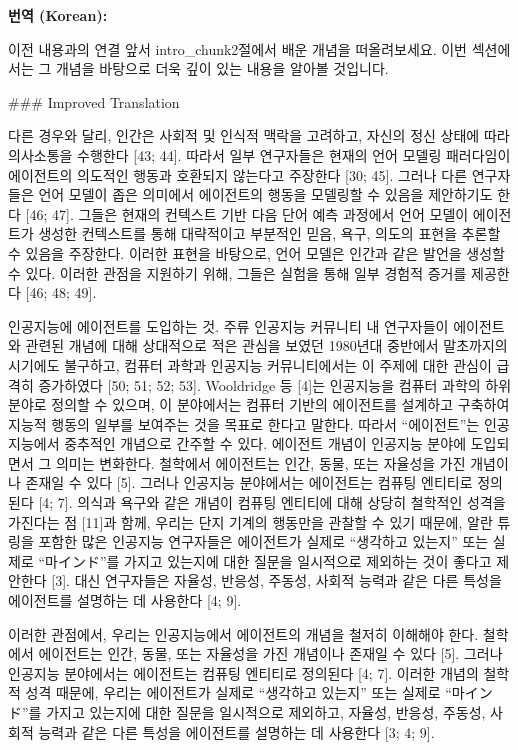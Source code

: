 \documentclass[12pt,a4paper]{article}
\begin{document}
\begin{mdframed}[style=ko]
\noindent\textbf{\small 번역 (Korean):}\\[2pt]
\begin{linkbox}{이전 내용과의 연결}
  앞서 intro_chunk2절에서 배운 개념을 떠올려보세요. 이번 섹션에서는 그 개념을 바탕으로 더욱 깊이 있는 내용을 알아볼 것입니다.
\end{linkbox}
### Improved Translation

다른 경우와 달리, 인간은 사회적 및 인식적 맥락을 고려하고, 자신의 정신 상태에 따라 의사소통을 수행한다 [43; 44]. 따라서 일부 연구자들은 현재의 언어 모델링 패러다임이 에이전트의 의도적인 행동과 호환되지 않는다고 주장한다 [30; 45]. 그러나 다른 연구자들은 언어 모델이 좁은 의미에서 에이전트의 행동을 모델링할 수 있음을 제안하기도 한다 [46; 47]. 그들은 현재의 컨텍스트 기반 다음 단어 예측 과정에서 언어 모델이 에이전트가 생성한 컨텍스트를 통해 대략적이고 부분적인 믿음, 욕구, 의도의 표현을 추론할 수 있음을 주장한다. 이러한 표현을 바탕으로, 언어 모델은 인간과 같은 발언을 생성할 수 있다. 이러한 관점을 지원하기 위해, 그들은 실험을 통해 일부 경험적 증거를 제공한다 [46; 48; 49].

인공지능에 에이전트를 도입하는 것. 주류 인공지능 커뮤니티 내 연구자들이 에이전트와 관련된 개념에 대해 상대적으로 적은 관심을 보였던 1980년대 중반에서 말초까지의 시기에도 불구하고, 컴퓨터 과학과 인공지능 커뮤니티에서는 이 주제에 대한 관심이 급격히 증가하였다 [50; 51; 52; 53]. Wooldridge 등 [4]는 인공지능을 컴퓨터 과학의 하위 분야로 정의할 수 있으며, 이 분야에서는 컴퓨터 기반의 에이전트를 설계하고 구축하여 지능적 행동의 일부를 보여주는 것을 목표로 한다고 말한다. 따라서 “에이전트”는 인공지능에서 중추적인 개념으로 간주할 수 있다. 에이전트 개념이 인공지능 분야에 도입되면서 그 의미는 변화한다. 철학에서 에이전트는 인간, 동물, 또는 자율성을 가진 개념이나 존재일 수 있다 [5]. 그러나 인공지능 분야에서는 에이전트는 컴퓨팅 엔티티로 정의된다 [4; 7]. 의식과 욕구와 같은 개념이 컴퓨팅 엔티티에 대해 상당히 철학적인 성격을 가진다는 점 [11]과 함께, 우리는 단지 기계의 행동만을 관찰할 수 있기 때문에, 알란 튜링을 포함한 많은 인공지능 연구자들은 에이전트가 실제로 “생각하고 있는지” 또는 실제로 “마インド”를 가지고 있는지에 대한 질문을 일시적으로 제외하는 것이 좋다고 제안한다 [3]. 대신 연구자들은 자율성, 반응성, 주동성, 사회적 능력과 같은 다른 특성을 에이전트를 설명하는 데 사용한다 [4; 9].

이러한 관점에서, 우리는 인공지능에서 에이전트의 개념을 철저히 이해해야 한다. 철학에서 에이전트는 인간, 동물, 또는 자율성을 가진 개념이나 존재일 수 있다 [5]. 그러나 인공지능 분야에서는 에이전트는 컴퓨팅 엔티티로 정의된다 [4; 7]. 이러한 개념의 철학적 성격 때문에, 우리는 에이전트가 실제로 “생각하고 있는지” 또는 실제로 “마インド”를 가지고 있는지에 대한 질문을 일시적으로 제외하고, 자율성, 반응성, 주동성, 사회적 능력과 같은 다른 특성을 에이전트를 설명하는 데 사용한다 [3; 4; 9].


\end{mdframed}
\end{document}
